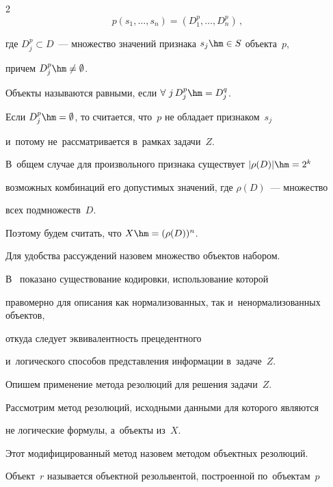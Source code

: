 \begin{multicols}{2}
$$


p\left(s_{1},\ldots,s_{n}\right)=\left(D^{p}_{1},\ldots,D^{p}_{n}\right)\,, 


$$


где $D^{p}_{j}\subset D $~--- множество значений признака $s_{j}\hm\in S $ объекта~$p$, 


причем $ D^{p}_{j}\hm\neq\emptyset $.


Объекты называются равными, если $ \forall\ j\, D^{p}_{j}\hm = D^{q}_{j} $.





Если $ D^{p}_{j}\hm=\emptyset$, то считается, что~$p$ не обладает признаком~$s_{j}$ 


и~потому не~рассматривается в~рамках задачи~$Z$.


В~общем случае для произвольного признака существует $ |\rho(D)|\hm=2^{k} $ 


возможных комбинаций его допустимых значений, где $\rho(D)$~--- множество 


всех подмножеств~$D$.


Поэтому будем считать, что $X\hm=(\rho(D))^{n} $.





Для удобства рассуждений назовем множество объектов набором.





В~\cite{patrec} показано существование кодировки, использование которой 


правомерно для описания как нормализованных, так и~ненормализованных объектов,


откуда следует эквивалентность прецедентного 


и~логического способов представления информации в~задаче~$Z$.





Опишем применение метода резолюций для решения задачи~$Z$.


Рассмотрим метод резолюций, исходными данными для которого являются 


не логические формулы, а~объекты из~$X$.


Этот модифицированный метод назовем методом объектных резолюций.





Объект~$r$ называется объектной резольвентой, построенной по~объектам~$p$ 



\end{multicols}
